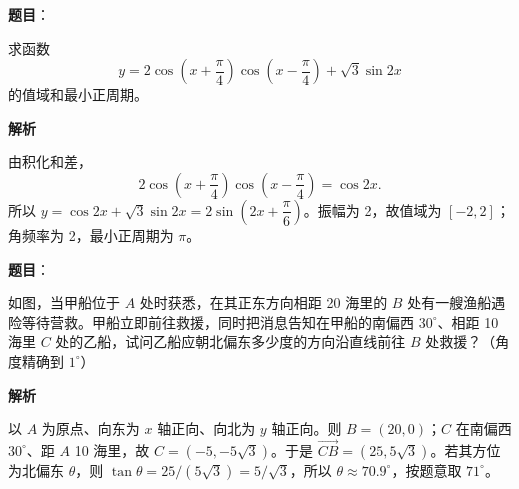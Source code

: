 \begin{answer}

\textbf{题目}：

求函数
\nopagebreak[4]
\[
y=2\cos\left(x+\frac\pi4\right)\cos\left(x-\frac\pi4\right)+\sqrt3\sin2x
\]
的值域和最小正周期。

\textbf{解析}

由积化和差，
\nopagebreak[4]
\[
2\cos\left(x+\frac\pi4\right)\cos\left(x-\frac\pi4\right)=\cos2x.
\]
所以 $y=\cos2x+\sqrt3\sin2x=2\sin\left(2x+\dfrac\pi6\right)$。振幅为 2，故值域为 $[-2,2]$；角频率为 2，最小正周期为 $\pi$。


\end{answer}
\begin{answer}

\textbf{题目}：

如图，当甲船位于 $A$ 处时获悉，在其正东方向相距 20 海里的 $B$ 处有一艘渔船遇险等待营救。甲船立即前往救援，同时把消息告知在甲船的南偏西 $30^\circ$、相距 10 海里 $C$ 处的乙船，试问乙船应朝北偏东多少度的方向沿直线前往 $B$ 处救援？（角度精确到 $1^\circ$）
\nopagebreak[4]
\begin{center}\end{center}
\nopagebreak[4]
\textbf{解析}

以 $A$ 为原点、向东为 $x$ 轴正向、向北为 $y$ 轴正向。则 $B=(20,0)$；$C$ 在南偏西 $30^\circ$、距 $A$ 10 海里，故 $C=(-5,-5\sqrt3)$。于是 $\overrightarrow{CB}=(25,5\sqrt3)$。若其方位为北偏东 $\theta$，则 $\tan\theta=25/(5\sqrt3)=5/\sqrt3$，所以 $\theta\approx70.9^\circ$，按题意取 $71^\circ$。


\end{answer}
